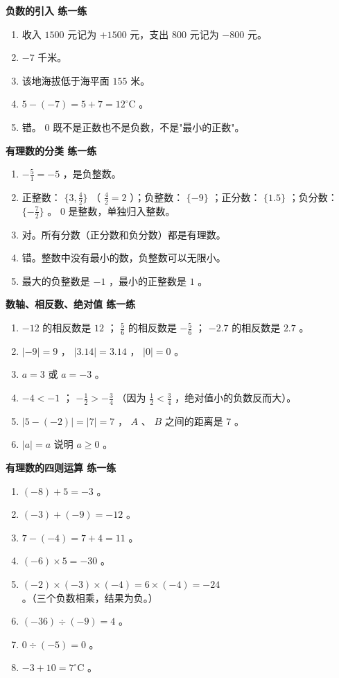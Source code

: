 \begin{answer}


\textbf{负数的引入 练一练}

\begin{enumerate}
  \item 收入 $1500$ 元记为 $+1500$ 元，支出 $800$ 元记为 $-800$ 元。
  \item $-7$ 千米。
  \item 该地海拔低于海平面 $155$ 米。
  \item $5 - (-7) = 5 + 7 = 12^\circ\text{C}$ 。
  \item 错。 $0$ 既不是正数也不是负数，不是"最小的正数"。
\end{enumerate}


\textbf{有理数的分类 练一练}

\begin{enumerate}
  \item $-\frac{5}{1} = -5$ ，是负整数。
  \item 正整数： $\{3, \frac{4}{2}\}$ （ $\frac{4}{2}=2$ ）；负整数： $\{-9\}$ ；正分数： $\{1.5\}$ ；负分数： $\{-\frac{7}{2}\}$ 。 $0$ 是整数，单独归入整数。
  \item 对。所有分数（正分数和负分数）都是有理数。
  \item 错。整数中没有最小的数，负整数可以无限小。
  \item 最大的负整数是 $-1$ ，最小的正整数是 $1$ 。
\end{enumerate}


\textbf{数轴、相反数、绝对值 练一练}

\begin{enumerate}
  \item $-12$ 的相反数是 $12$ ； $\frac{5}{6}$ 的相反数是 $-\frac{5}{6}$ ； $-2.7$ 的相反数是 $2.7$ 。
  \item $\lvert -9 \rvert = 9$ ， $\lvert 3.14 \rvert = 3.14$ ， $\lvert 0 \rvert = 0$ 。
  \item $a = 3$ 或 $a = -3$ 。
  \item $-4 < -1$ ； $-\frac{1}{2} > -\frac{3}{4}$ （因为 $\frac{1}{2} < \frac{3}{4}$ ，绝对值小的负数反而大）。
  \item $\lvert 5 - (-2) \rvert = \lvert 7 \rvert = 7$ ， $A$ 、 $B$ 之间的距离是 $7$ 。
  \item $\lvert a \rvert = a$ 说明 $a \geq 0$ 。
\end{enumerate}


\textbf{有理数的四则运算 练一练}

\begin{enumerate}
  \item $(-8) + 5 = -3$ 。
  \item $(-3) + (-9) = -12$ 。
  \item $7 - (-4) = 7 + 4 = 11$ 。
  \item $(-6) \times 5 = -30$ 。
  \item $(-2) \times (-3) \times (-4) = 6 \times (-4) = -24$ 。（三个负数相乘，结果为负。）
  \item $(-36) \div (-9) = 4$ 。
  \item $0 \div (-5) = 0$ 。
  \item $-3 + 10 = 7^\circ\text{C}$ 。
\end{enumerate}



\end{answer}
